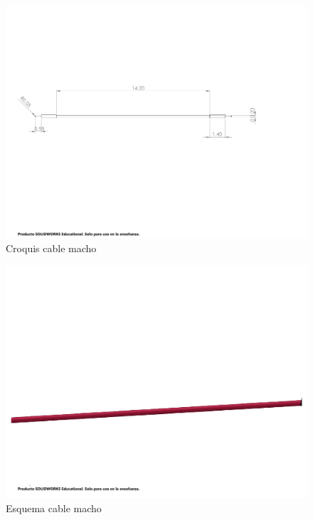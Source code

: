     \begin{figure}[H]
        \centering
        \includegraphics[trim = {10mm 10mm 10mm 10mm},clip,scale=0.5]{25/img/Croquis cable macho.pdf}
        \caption{Croquis cable macho}
        \label{fig:lcd-16x2}
    \end{figure}
    \begin{figure}[H]
        \centering
        \includegraphics[trim = {10mm 10mm 10mm 10mm},clip,scale=0.2]{25/img/Cable macho.pdf}
        \caption{Esquema cable macho}
        \label{fig:lcd-16x2}
    \end{figure}
